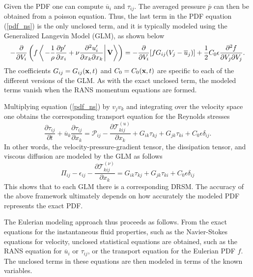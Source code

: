 \documentclass[oneside,a4paper,11pt]{report}
\newcommand{\pavg}{\overline{p}}
\newcommand{\uavg}{\overline{u}}
\newcommand{\pfluc}{p'}
\newcommand{\ufluc}{u'}
\newcommand{\rs}{\tau}          %
\begin{document}
Given the PDF one can compute $\uavg_i$ and $\rs_{ij}$. The averaged pressure $\pavg$ can then be obtained from a poisson equation. Thus, the last term in the PDF equation (\ref{pdf_ns}) is the only unclosed term, and it is typically modeled using the Generalized Langevin Model (GLM), as shown below
\begin{equation}
\label{GLM}
- \frac{\partial}{\partial V_i} \left ( f \left < \left . - \frac{1}{\rho} \frac{\partial \pfluc}{\partial x_i} +  \nu \frac{\partial^2 \ufluc_i}{\partial x_k \partial x_k} \right | \Vvec \right > \right ) = -\frac{\partial}{\partial V_i} [f G_{ij} (V_j - \uavg_j)] + \frac{1}{2} C_0 \epsilon \frac{\partial^2 f}{\partial V_j \partial V_j}.
\end{equation}
The coefficients $G_{ij} = G_{ij}(\mathbf{x},t)$ and $C_0 = C_0(\mathbf{x},t)$ are specific to each of the different versions of the GLM. As with the exact unclosed term, the modeled terms vanish when the RANS momentum equations are formed. 

Multiplying equation (\ref{pdf_ns}) by $v_j v_k$ and integrating over the velocity space one obtains the corresponding transport equation for the Reynolds stresses
\begin{equation}
\frac{\partial \rs_{ij}}{\partial t} + \uavg_k \frac{\partial \rs_{ij}}{\partial x_k} = \mathcal{P}_{ij} - \frac{\partial \mathcal{T}^{(u)}_{kij} }{\partial x_k} + G_{ik} \rs_{kj} + G_{jk} \rs_{ki} + C_0 \epsilon \delta_{ij}.
\end{equation} 
In other words, the velocity-pressure-gradient tensor, the dissipation tensor, and viscous diffusion are modeled by the GLM as follows
\begin{equation}
\Pi_{ij} - \epsilon_{ij} - \frac{\partial \mathcal{T}^{(\nu)}_{kij} }{\partial x_k} = G_{ik} \rs_{kj} + G_{jk} \rs_{ki} + C_0 \epsilon \delta_{ij}
\end{equation}
This shows that to each GLM there is a corresponding DRSM. The accuracy of the above framework ultimately depends on how accurately the modeled PDF represents the exact PDF.

The Eulerian modeling approach thus proceeds as follows. From the exact equations for the instantaneous fluid properties, such as the Navier-Stokes equations for velocity, unclosed statistical equations are obtained, such as the RANS equation for $\uavg_i$ or $\rs_{ij}$, or the transport equation for the Eulerian PDF $f$. The unclosed terms in these equations are then modeled in terms of the known variables.
\end{document}
